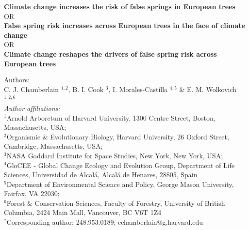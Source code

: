\documentclass{article}\usepackage[]{graphicx}\usepackage[]{color}
\begin{document}
\noindent \textbf{\Large{Climate change increases the risk of false springs in European trees}} \\ %
OR \\
\textbf{\Large{False spring risk increases across European trees in the face of climate change}} \\
OR \\
\textbf{\LARGE{Climate change reshapes the drivers of false spring risk across European trees}}

\noindent Authors:\\
C. J. Chamberlain $^{1,2}$, B. I. Cook $^{3}$, I. Morales-Castilla $^{4,5}$ \& E. M. Wolkovich $^{1,2,6}$
\vspace{2ex}\\
\emph{Author affiliations:}\\
$^{1}$Arnold Arboretum of Harvard University, 1300 Centre Street, Boston, Massachusetts, USA; \\
$^{2}$Organismic \& Evolutionary Biology, Harvard University, 26 Oxford Street, Cambridge, Massachusetts, USA; \\
$^{3}$NASA Goddard Institute for Space Studies, New York, New York, USA; \\
$^{4}$GloCEE - Global Change Ecology and Evolution Group, Department of Life Sciences, Universidad de Alcal\'{a}, Alcal\'{a} de Henares, 28805, Spain \\
$^{5}$Department of Environmental Science and Policy, George Mason University, Fairfax, VA 22030; \\
$^{6}$Forest \& Conservation Sciences, Faculty of Forestry, University of British Columbia, 2424 Main Mall, Vancouver, BC V6T 1Z4\\
\vspace{2ex}
$^*$Corresponding author: 248.953.0189; cchamberlain@g.harvard.edu\\

\renewcommand{\thetable}{\arabic{table}}
\renewcommand{\thefigure}{\arabic{figure}}
\renewcommand{\labelitemi}{$-$}

\end{document}
